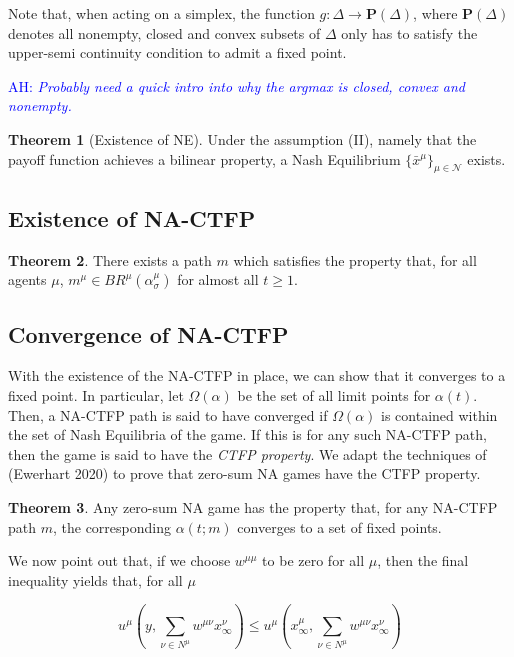 \documentclass{article}
\theoremstyle{definition}
\newtheorem{theorem}{Theorem}
\newcommand{\ah}[1]{\textcolor{blue}{AH: \textit{#1}}}
\newcommand{\agentset}{\mathcal{N}}
\newcommand{\wmunu}{w^{\mu \nu}}
\newcommand{\xmu}{x^{\mu}}
\newcommand{\xnu}{x^{\nu}}
\begin{document}
  Note that, when acting on a simplex, the function $g: \Delta \rightarrow \textbf{P}(\Delta)$, where $\textbf{P}(\Delta)$ denotes all nonempty, closed and convex subsets of $\Delta$ only has to satisfy the upper-semi continuity condition to admit a fixed point.

	\ah{Probably need a quick intro into why the argmax is closed, convex and nonempty.}

  \begin{theorem}[Existence of NE]
    Under the assumption (II), namely that the payoff function achieves a bilinear property, a
    Nash Equilibrium $\{\bar{x}^\mu\}_{\mu \in \agentset}$ exists.
  \end{theorem}

\subsection{Existence of NA-CTFP}

  \begin{theorem}
    There exists a path $m$ which satisfies the property that, for all agents $\mu$, $m^\mu \in
    BR^\mu(\alpha_\sigma^\mu)$ for almost all $t \geq 1$.
  \end{theorem}

\subsection{Convergence of NA-CTFP}

With the existence of the NA-CTFP in place, we can show that it converges
to a fixed point. In particular, let $\Omega(\alpha)$ be the set of
all limit points for $\alpha(t)$. Then, a NA-CTFP path is said to have
converged if $\Omega(\alpha)$ is contained within the set of Nash
Equilibria of the game. If this is for any such NA-CTFP path, then the
game is said to have the \emph{CTFP property}. We adapt the techniques
of (Ewerhart 2020) to prove that zero-sum NA games have the CTFP
property.

  \begin{theorem}
    Any zero-sum NA game has the property that, for any NA-CTFP path $m$, the corresponding $\alpha(t; m)$ converges to a set of fixed points.
  \end{theorem}


  We now point out that, if we choose $w^{\mu \mu}$ to be zero for all $\mu$, then the final inequality yields that, for all $\mu$

  \begin{equation}
    u^\mu(y, \sum_{\nu \in N^\mu} \wmunu \xnu_\infty) \leq u^\mu(\xmu_\infty, \sum_{\nu \in N^\mu} \wmunu \xnu_\infty)
  \end{equation}
\end{document}

